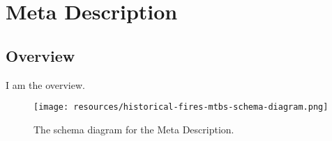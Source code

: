 
\section{Meta Description}
\label{sec:meta-description}
\subsection{Overview}
\label{ssec:overview}

I am the overview.

\begin{figure}[h!]
  \begin{center}
    \texttt{[image: resources/historical-fires-mtbs-schema-diagram.png]}
  \end{center}
  \caption{The schema diagram for the Meta Description.}
  \label{fig:ov-diagram}
\end{figure}



